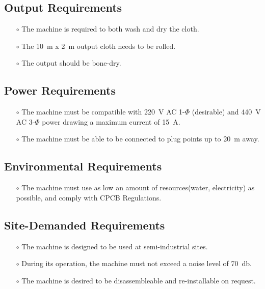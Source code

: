 \documentclass[12pt]{article}
\begin{document}
\subsection{Output Requirements}
\begin{itemize}
    \item[$\scriptstyle\circ$] The machine is required to both wash and dry the cloth. 
    \item [$\scriptstyle\circ$] The \SI{10}{\meter} x \SI{2}{\meter} output cloth needs to be rolled.
    \item [$\scriptstyle\circ$] The output should be bone-dry.
\end{itemize}
\subsection{Power Requirements}
\begin{itemize}
    \item[$\scriptstyle\circ$] The machine must be compatible with \SI{220}{\volt} AC 1-$\Phi$ (desirable) and \SI{440}{\volt} AC 3-$\Phi$ power drawing a maximum current of \SI{15}{\ampere}.
    \item[$\scriptstyle\circ$] The machine must be able to be connected to plug points up to \SI{20}{\meter} away. 
\end{itemize}
\subsection{Environmental Requirements}
\begin{itemize}
    \item[$\scriptstyle\circ$] The machine must use as low an amount of resources(water, electricity) as possible, and comply with \Gls{CPCB Regulations}. 
\end{itemize}
\subsection{Site-Demanded Requirements}
\begin{itemize}
    \item[$\scriptstyle\circ$] The machine is designed to be used at \gls{semi-industrial sites}. 
    \item[$\scriptstyle\circ$] During its operation, the machine must not exceed a noise level of \SI{70}{\decibel}. 
    \item[$\scriptstyle\circ$] The machine is desired to be disassembleable and re-installable on request. 
\end{itemize}
\end{document}
